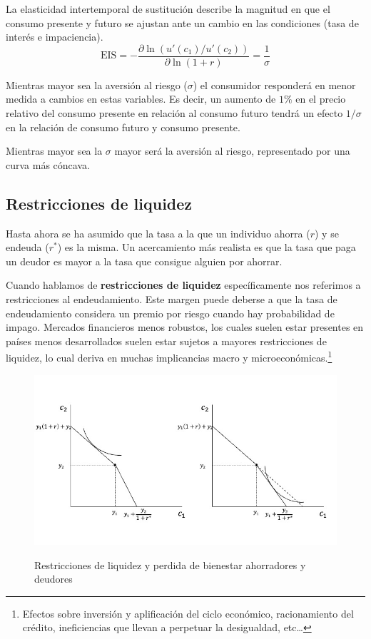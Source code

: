 La elasticidad intertemporal de sustitución describe la magnitud en que el consumo presente y futuro se ajustan ante un cambio en las condiciones (tasa de interés e impaciencia). 
\begin{equation}
    \text{EIS} = - \frac{\partial \ln (u'(c_1)/u'(c_2))}{\partial \ln (1+r)} = \frac{1}{\sigma}
\end{equation}

Mientras mayor sea la aversión al riesgo ($\sigma$) el consumidor responderá en menor medida a cambios en estas variables. Es decir, un aumento de $1\%$ en el precio relativo del consumo presente en relación al consumo futuro tendrá un efecto $1/\sigma$ en la relación de consumo futuro y consumo presente.

Mientras mayor sea la $\sigma$ mayor será la aversión al riesgo, representado por una curva más cóncava. 

\subsection{Restricciones de liquidez}

Hasta ahora se ha asumido que la tasa a la que un individuo ahorra ($r$) y se endeuda ($r^*$) es la misma. Un acercamiento más realista es que la tasa que paga un deudor es mayor a la tasa que consigue alguien por ahorrar. 

Cuando hablamos de \textbf{restricciones de liquidez} específicamente nos referimos a restricciones al endeudamiento. Este margen puede deberse a que la tasa de endeudamiento considera un premio por riesgo cuando hay probabilidad de impago. Mercados financieros menos robustos, los cuales suelen estar presentes en países menos desarrollados suelen estar sujetos a mayores restricciones de liquidez, lo cual deriva en muchas implicancias macro y microeconómicas.\footnote{Efectos sobre inversión y aplificación del ciclo económico, racionamiento del crédito, ineficiencias que llevan a perpetuar la desigualdad, etc\ldots}

\begin{figure}[t]
    \centering
    \caption{Restricciones de liquidez y perdida de bienestar ahorradores y deudores}
    \includegraphics[width=\textwidth]{Figuras/CI Restricciones de liquidez.jpeg}
    \label{fig: Restricciones liquidez bienestar}
\end{figure}

